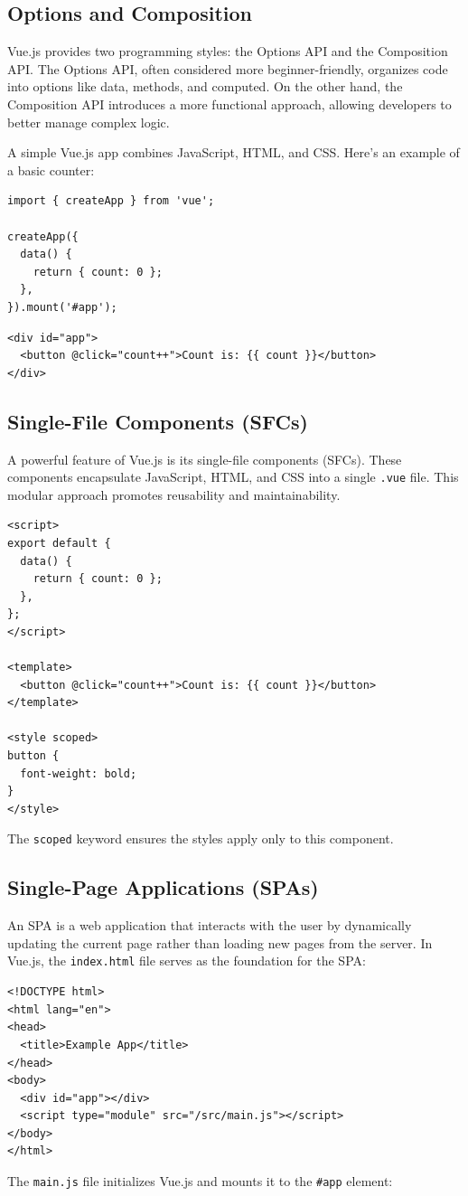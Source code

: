 \subsection*{Options and Composition}
Vue.js provides two programming styles: the Options API and the Composition API. The Options API, often considered more beginner-friendly, organizes code into options like data, methods, and computed. On the other hand, the Composition API introduces a more functional approach, allowing developers to better manage complex logic.

A simple Vue.js app combines JavaScript, HTML, and CSS. Here’s an example of a basic counter:
\begin{verbatim}
import { createApp } from 'vue';

createApp({
  data() {
    return { count: 0 };
  },
}).mount('#app');
\end{verbatim}
\begin{verbatim}
<div id="app">
  <button @click="count++">Count is: {{ count }}</button>
</div>
\end{verbatim}

\subsection*{Single-File Components (SFCs)}
A powerful feature of Vue.js is its single-file components (SFCs). These components encapsulate JavaScript, HTML, and CSS into a single \texttt{.vue} file. This modular approach promotes reusability and maintainability.

\begin{verbatim}
<script>
export default {
  data() {
    return { count: 0 };
  },
};
</script>

<template>
  <button @click="count++">Count is: {{ count }}</button>
</template>

<style scoped>
button {
  font-weight: bold;
}
</style>
\end{verbatim}
The \texttt{scoped} keyword ensures the styles apply only to this component.

\subsection*{Single-Page Applications (SPAs)}
An SPA is a web application that interacts with the user by dynamically updating the current page rather than loading new pages from the server. In Vue.js, the \texttt{index.html} file serves as the foundation for the SPA:
\begin{verbatim}
<!DOCTYPE html>
<html lang="en">
<head>
  <title>Example App</title>
</head>
<body>
  <div id="app"></div>
  <script type="module" src="/src/main.js"></script>
</body>
</html>    
\end{verbatim}
The \texttt{main.js} file initializes Vue.js and mounts it to the \texttt{\#app} element:

